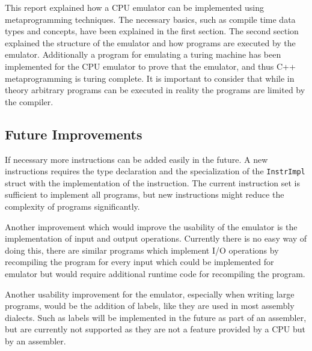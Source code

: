 

This report explained how a CPU emulator can be implemented using metaprogramming techniques.
The necessary basics, such as compile time data types and concepts, have been explained 
in the first section. The second section explained the structure of the emulator and how
programs are executed by the emulator. Additionally a program for emulating a turing
machine has been implemented for the CPU emulator to prove that the emulator, and thus
C++ metaprogramming is turing complete. It is important to consider that while in theory
arbitrary programs can be executed in reality the programs are limited by the compiler.

\subsection{Future Improvements}
If necessary more instructions can be added easily in the future. A new instructions
requires the type declaration and the specialization of the \lstinline{InstrImpl}
struct with the implementation of the instruction. The current instruction set
is sufficient to implement all programs, but new instructions might reduce the
complexity of programs significantly.

Another improvement which would improve the usability of the emulator is the implementation
of input and output operations. Currently there is no easy way of doing this, there are
similar programs which implement I/O operations by recompiling the program for
every input  which could be implemented for
emulator but would require additional runtime code for recompiling the program.

Another usability improvement for the emulator, especially when writing large programs,
would be the addition of labels, like they are used in most assembly dialects.
Such as labels will be implemented in the future as part of an assembler, but are
currently not supported as they are not a feature provided by a CPU but by an assembler.

